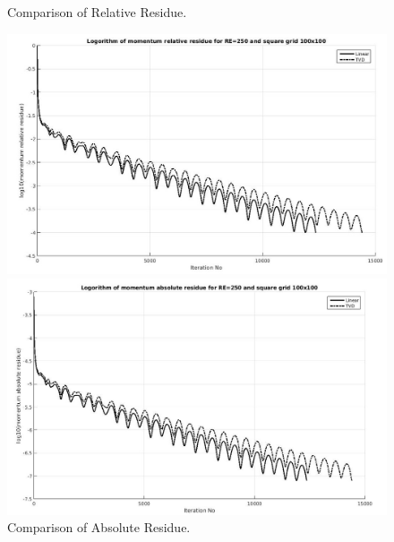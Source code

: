 \documentclass[12pt]{elsarticle}
\begin{document}
	\begin{figure}[h]
		\caption{Comparison of Relative Residue.}
		\centering\includegraphics[width=1.0\linewidth]{29_rr_tvd_linear_re_250_100_100}
		\caption{Comparison of Absolute Residue.}
		\centering\includegraphics[width=1.0\linewidth]{30_ar_tvd_linear_re_250_100_100}
	\end{figure}
	
\end{document}
